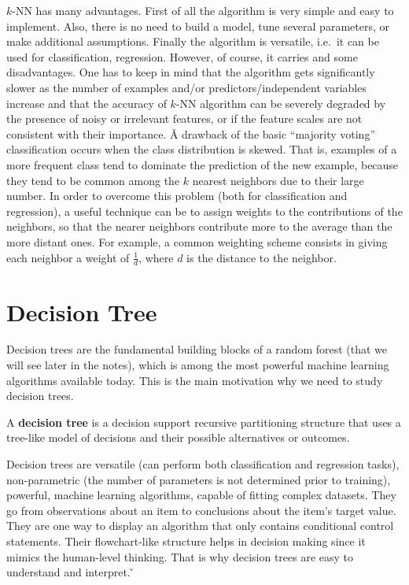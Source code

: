 
$k$-NN has many advantages. First of all the algorithm is very simple and easy to implement. Also, there is no need
to build a model, tune several parameters, or make additional assumptions. Finally the algorithm is versatile, i.e.\
it can be used for classification, regression. However, of course, it carries and some disadvantages. One has to
keep in mind that the algorithm gets significantly slower as the number of examples and/or predictors/independent
variables increase and that the accuracy of $k$-NN algorithm can be severely degraded by the presence of noisy or
irrelevant features, or if the feature scales are not consistent with their importance. \v

A drawback of the basic ``majority voting'' classification occurs when the class distribution is skewed. That is,
examples of a more frequent class tend to dominate the prediction of the new example, because they tend to be common
among the $k$ nearest neighbors due to their large number. In order to overcome this problem (both for classification
and regression), a useful technique can be to assign weights to the contributions of the neighbors, so that the
nearer neighbors contribute more to the average than the more distant ones. For example, a common weighting scheme
consists in giving each neighbor a weight of $\frac{1}{d}$, where $d$ is the distance to the neighbor.

\section{Decision Tree}

Decision trees are the fundamental building blocks of a random forest (that we will see later in the notes), which is
among the most powerful machine learning algorithms available today. This is the main motivation why we need to study
decision trees.

A \textbf{decision tree} is a decision support recursive partitioning structure that uses a tree-like model of
decisions and their possible alternatives or outcomes.
\ed

Decision trees are versatile (can perform both classification and regression tasks), non-parametric (the number of
parameters is not determined prior to training), powerful, machine learning algorithms, capable of fitting complex
datasets. They go from observations about an item to conclusions about the item's target value. They are one way to
display an algorithm that only contains conditional control statements. Their flowchart-like structure helps in
decision making since it mimics the human-level thinking. That is why decision trees are easy to understand and
interpret. \v

